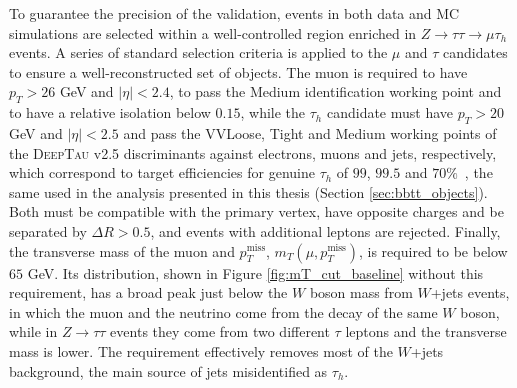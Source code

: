 To guarantee the precision of the validation, events in both data and MC simulations are selected within a well-controlled region enriched in $Z\rightarrow \tau\tau \rightarrow \mu \tau_h$ events. A series of standard selection criteria is applied to the $\mu$ and $\tau$ candidates to ensure a well-reconstructed set of objects. The muon is required to have $p_T > 26$ GeV and $|\eta| < 2.4$, to pass the Medium identification working point and to have a relative isolation below $0.15$, while the $\tau_h$ candidate must have $p_T > 20$ GeV and $|\eta| < 2.5$ and pass the VVLoose, Tight and Medium working points of the \textsc{DeepTau} v2.5 discriminants against electrons, muons and jets, respectively, which correspond to target efficiencies for genuine $\tau_h$ of $99$, $99.5$ and $70\%$~\cite{CMS-TAU-24-001}, the same used in the analysis presented in this thesis (Section \ref{sec:bbtt_objects}). Both must be compatible with the primary vertex, have opposite charges and be separated by $\Delta R > 0.5$, and events with additional leptons are rejected. Finally, the transverse mass of the muon and $p_T^\text{miss}$, $m_T(\mu,p_T^\text{miss})$, is required to be below $65$ GeV. Its distribution, shown in Figure \ref{fig:mT_cut_baseline} without this requirement, has a broad peak just below the $W$ boson mass from $W$+jets events, in which the muon and the neutrino come from the decay of the same $W$ boson, while in $Z\to\tau\tau$ events they come from two different $\tau$ leptons and the transverse mass is lower. The requirement effectively removes most of the $W$+jets background, the main source of jets misidentified as $\tau_h$. 
%
